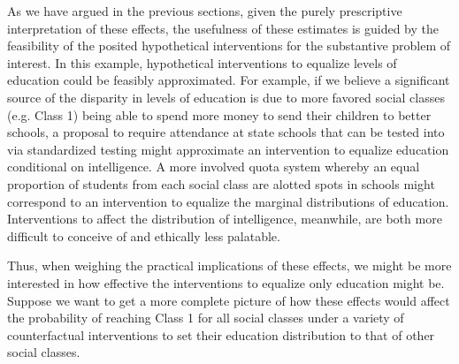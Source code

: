 As we have argued in the previous sections, given the purely prescriptive interpretation of these effects, the 
usefulness of these estimates is guided by the feasibility of the posited hypothetical interventions for the 
substantive problem of interest. In this example, hypothetical interventions to equalize levels of education could be 
feasibly approximated. For example, if we believe a significant source of the disparity in levels of education is due 
to more favored social classes (e.g. Class 1) being able to spend more money to send their children to better schools, 
a proposal to require attendance at state schools that can be tested into via standardized testing might approximate an 
intervention to equalize education conditional on intelligence. A more involved quota system whereby an equal proportion 
of students from each social class are alotted spots in schools might correspond to an intervention to equalize the 
marginal distributions of education. Interventions to affect the distribution of intelligence, meanwhile, are both more 
difficult to conceive of and ethically less palatable. 

Thus, when weighing the practical implications of these effects, we might be more interested in how effective 
the interventions to equalize only education might be. Suppose we want to get a more complete picture of how these effects
would affect the probability of reaching Class 1 for all social classes under a variety of counterfactual interventions to 
set their education distribution to that of other social classes. 

